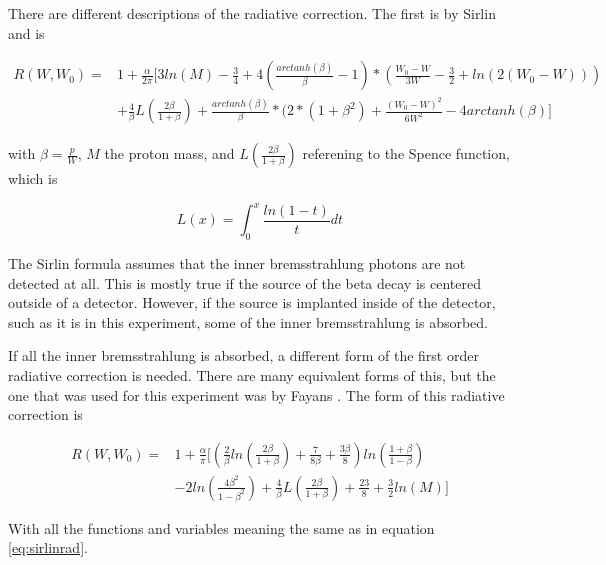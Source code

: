 \documentclass[../MaxHughesThesis.tex]{subfiles}
\begin{document}
There are different descriptions of the radiative correction.  
The first is by Sirlin \cite{Sir67} and is %

\begin{equation}
	\label{eq:sirlinrad}
	\begin{split}
	R(W,W_{0}) = & 1 + \frac{\alpha}{2\pi}[3ln(M) - \frac{3}{4} + 4(\frac{arctanh(\beta)}{\beta} - 1)*(\frac{W_{0} - W}{3W} - \frac{3}{2} + ln(2(W_{0} - W))) \\
	 & + \frac{4}{\beta}L(\frac{2\beta}{1 + \beta}) + \frac{arctanh(\beta)}{\beta}*(2*(1 + \beta^{2}) + \frac{(W_{0} - W)^{2}}{6W^{2}} - 4 arctanh(\beta)]
	\end{split}
\end{equation} 

with $\beta = \frac{p}{W}$, $M$ the proton mass, and $L(\frac{2\beta}{1+\beta})$ referening to the Spence function, which is \cite{Wil95} %

\begin{equation}
	L(x) = \int_{0}^{x} \frac{ln(1 - t)}{t}dt
	\label{eq:spence}
\end{equation}

The Sirlin formula assumes that the inner bremsstrahlung photons are not detected at all.
This is mostly true if the source of the beta decay is centered outside of a detector.
However, if the source is implanted inside of the detector, such as it is in this experiment, some of the inner bremsstrahlung is absorbed.

If all the inner bremsstrahlung is absorbed, a different form of the first order radiative correction is needed.
There are many equivalent forms of this, but the one that was used for this experiment was by Fayans \cite{Fay86}.
The form of this radiative correction is %

\begin{equation}	
	\label{eq:fayansrad}
	\begin{split}
	R(W,W_{0}) = & 1 + \frac{\alpha}{\pi}[(\frac{2}{\beta}ln(\frac{2\beta}{1+\beta}) + \frac{7}{8\beta} + \frac{3\beta}{8})ln(\frac{1 + \beta}{1 - \beta}) \\
	& - 2ln(\frac{4\beta^{2}}{1 - \beta^{2}}) + \frac{4}{\beta}L(\frac{2\beta}{1+\beta}) + \frac{23}{8} + \frac{3}{2}ln(M)]
	\end{split}
\end{equation}

With all the functions and variables meaning the same as in equation \ref{eq:sirlinrad}.
\end{document}
